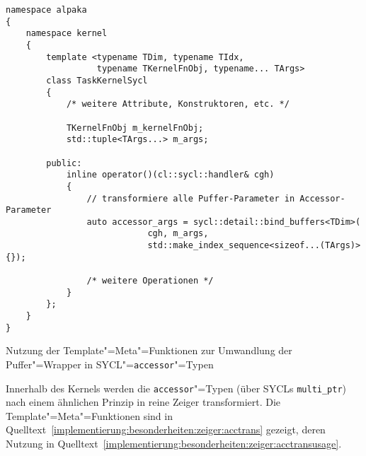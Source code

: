 \begin{code}
    \begin{verbatim}
namespace alpaka
{
    namespace kernel
    {
        template <typename TDim, typename TIdx,
                  typename TKernelFnObj, typename... TArgs>
        class TaskKernelSycl
        {
            /* weitere Attribute, Konstruktoren, etc. */

            TKernelFnObj m_kernelFnObj;
            std::tuple<TArgs...> m_args;

        public:
            inline operator()(cl::sycl::handler& cgh)
            {
                // transformiere alle Puffer-Parameter in Accessor-Parameter
                auto accessor_args = sycl::detail::bind_buffers<TDim>(
                            cgh, m_args,
                            std::make_index_sequence<sizeof...(TArgs)>{});

                /* weitere Operationen */
            }
        };
    }
}
    \end{verbatim}
    \caption{Nutzung der Template"=Meta"=Funktionen zur Umwandlung der
             Puffer"=Wrapper in SYCL"=\texttt{accessor}"=Typen}
    \label{implementierung:besonderheiten:zeiger:transusage}
\end{code}

Innerhalb des Kernels werden die \texttt{accessor}"=Typen (über SYCLs
\texttt{multi\_ptr}) nach einem ähnlichen Prinzip in reine Zeiger transformiert.
Die Template"=Meta"=Funktionen sind in
Quelltext~\ref{implementierung:besonderheiten:zeiger:acctrans} gezeigt, deren
Nutzung in Quelltext~\ref{implementierung:besonderheiten:zeiger:acctransusage}.

